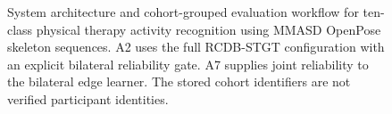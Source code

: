 
\begin{figure}[htbp]
    \centering
    
    \caption{System architecture and cohort-grouped evaluation workflow for ten-class physical therapy activity recognition using MMASD OpenPose skeleton sequences. A2 uses the full RCDB-STGT configuration with an explicit bilateral reliability gate. A7 supplies joint reliability to the bilateral edge learner. The stored cohort identifiers are not verified participant identities.}
    \label{fig:system-architecture}
\end{figure}
